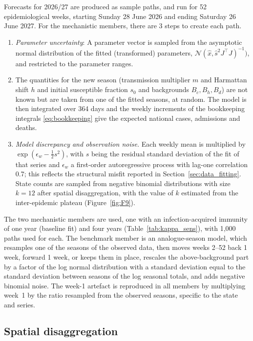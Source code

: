 \documentclass[12pt,a4paper]{article}
\theoremstyle{definition}
\theoremstyle{remark}
\begin{document}
Forecasts for 2026/27 are produced as sample paths, and run for 52 epidemiological weeks, starting Sunday 28 June 2026 and ending Saturday 26 June 2027. For the mechanistic members, there are 3 steps to create each path.
\begin{enumerate}[label=(\roman*)]
\item \emph{Parameter uncertainty}: A parameter vector is sampled from the asymptotic normal distribution of the fitted (transformed) parameters, $\mathcal{N}(\hat{x},\hat{s}^2 J^\top J)^{-1})$, and restricted to the parameter ranges.
\item The quantities for the new season (transmission multiplier $m$ and Harmattan shift $h$ and initial susceptible fraction $s_0$ and backgrounds $B_{c},B_{h},B_{d}$) are not known but are taken from one of the fitted seasons, at random. The model is then integrated over 364 days and the weekly increments of the bookkeeping integrals \eqref{eq:bookkeeping} give the expected national cases, admissions and deaths.
\item \emph{Model discrepancy and observation noise.} Each weekly mean is multiplied by $\exp(\epsilon_w-\tfrac12 s^2)$, with $s$ being the residual standard deviation of the fit of that series and $\epsilon_w$ a first-order autoregressive process with lag-one correlation 0.7; this reflects the structural misfit reported in Section~\ref{sec:data_fitting}. State counts are sampled from negative binomial distributions with size $k=12$ after spatial disaggregation, with the value of $k$ estimated from the inter-epidemic plateau (Figure~\ref{fig:F9}).
\end{enumerate}
The two mechanistic members are used, one with an infection-acquired immunity of one year (baseline fit) and four years (Table~\ref{tab:kappa_sens}), with 1,000 paths used for each. The benchmark member is an analogue-season model, which resamples one of the seasons of the observed data, then moves weeks 2--52 back 1 week, forward 1 week, or keeps them in place, rescales the above-background part by a factor of the log normal distribution with a standard deviation equal to the standard deviation between seasons of the log seasonal totals, and adds negative binomial noise. The week-1 artefact is reproduced in all members by multiplying week~1 by the ratio resampled from the observed seasons, specific to the state and series.

\subsection{Spatial disaggregation}\label{sec:spatial_layer}
\end{document}
